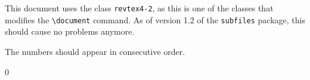 \documentclass{revtex4-2}
\begin{document}
This document uses the class \verb|revtex4-2|, as this is one of the
classes that modifies the \verb|\document| command. As of version 1.2
of the \verb|subfiles| package, this should cause no problems anymore.

The numbers should appear in consecutive order.

0



\end{document}
